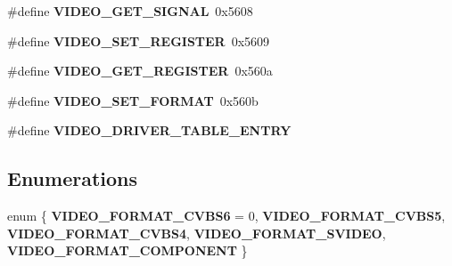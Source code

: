 \begin{DoxyCompactItemize}
\mbox{\label{group__lm32__milkymist__video_ga04b147e07238a557858cc98efda56dff}} 
\#define {\bfseries V\+I\+D\+E\+O\+\_\+\+G\+E\+T\+\_\+\+S\+I\+G\+N\+AL}~0x5608
\item 
\mbox{\label{group__lm32__milkymist__video_ga87ee52e798fd36d3688d2e1042358438}} 
\#define {\bfseries V\+I\+D\+E\+O\+\_\+\+S\+E\+T\+\_\+\+R\+E\+G\+I\+S\+T\+ER}~0x5609
\item 
\mbox{\label{group__lm32__milkymist__video_ga88455b6f67a1d8f6f3c9983d356e1236}} 
\#define {\bfseries V\+I\+D\+E\+O\+\_\+\+G\+E\+T\+\_\+\+R\+E\+G\+I\+S\+T\+ER}~0x560a
\item 
\mbox{\label{group__lm32__milkymist__video_ga568a7dc04361eaa123edcad84ee428df}} 
\#define {\bfseries V\+I\+D\+E\+O\+\_\+\+S\+E\+T\+\_\+\+F\+O\+R\+M\+AT}~0x560b
\item 
\#define {\bfseries V\+I\+D\+E\+O\+\_\+\+D\+R\+I\+V\+E\+R\+\_\+\+T\+A\+B\+L\+E\+\_\+\+E\+N\+T\+RY}
\end{DoxyCompactItemize}
\subsection*{Enumerations}
\begin{DoxyCompactItemize}
\item 
\mbox{\label{group__lm32__milkymist__video_gafb24d298ddd4bc4ff61aa333f07a574a}} 
enum \{ \newline
{\bfseries V\+I\+D\+E\+O\+\_\+\+F\+O\+R\+M\+A\+T\+\_\+\+C\+V\+B\+S6} = 0, 
{\bfseries V\+I\+D\+E\+O\+\_\+\+F\+O\+R\+M\+A\+T\+\_\+\+C\+V\+B\+S5}, 
{\bfseries V\+I\+D\+E\+O\+\_\+\+F\+O\+R\+M\+A\+T\+\_\+\+C\+V\+B\+S4}, 
{\bfseries V\+I\+D\+E\+O\+\_\+\+F\+O\+R\+M\+A\+T\+\_\+\+S\+V\+I\+D\+EO}, 
\newline
{\bfseries V\+I\+D\+E\+O\+\_\+\+F\+O\+R\+M\+A\+T\+\_\+\+C\+O\+M\+P\+O\+N\+E\+NT}
 \}
\end{DoxyCompactItemize}

